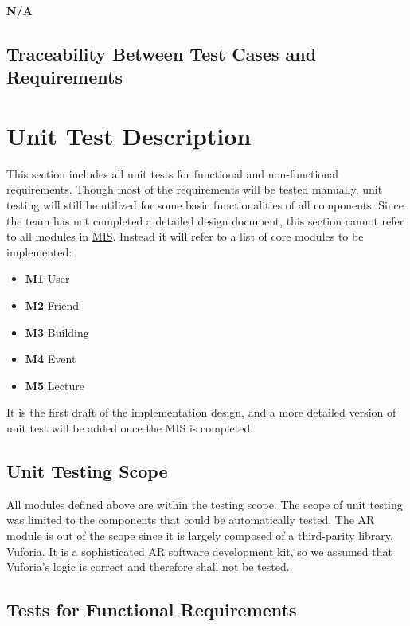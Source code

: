 \documentclass[12pt, titlepage]{article}
\begin{document}
\quad \textbf{N/A}

\subsection{Traceability Between Test Cases and Requirements}


\section{Unit Test Description}

This section includes all unit tests for functional and non-functional requirements. Though most of the requirements will be tested manually, unit testing will still be utilized for some basic functionalities of all components. Since the team has not completed a detailed design document, this section cannot refer to all modules in \href{https://github.com/beatlepie/4G06CapstoneProjectTeam2/blob/main/docs/Design/SoftDetailedDes/MIS.pdf}{MIS}. Instead it will refer to a list of core modules to be implemented:
\begin{itemize}
	\item \textbf{M1} User
	\item \textbf{M2} Friend
	\item \textbf{M3} Building
	\item \textbf{M4} Event
	\item \textbf{M5} Lecture
\end{itemize}
It is the first draft of the implementation design, and a more detailed version of unit test will be added once the MIS is completed.

\subsection{Unit Testing Scope}

All modules defined above are within the testing scope.  The scope of unit testing was limited to the components that could be automatically tested. The AR module is out of the scope since it is largely composed of a third-parity library, Vuforia. It is a sophisticated AR software development kit, so we assumed that Vuforia’s logic is correct and therefore shall not be tested.

\subsection{Tests for Functional Requirements}
\end{document}
